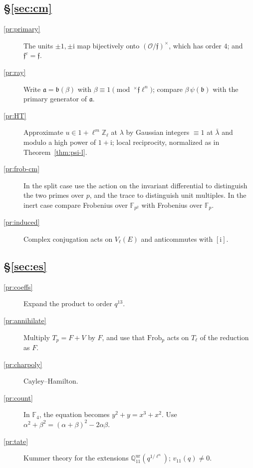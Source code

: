 \documentclass[reqno]{amsart}
\theoremstyle{definition}
\theoremstyle{plain}
\newcommand{\Z}{\mathbb{Z}}
\newcommand{\Q}{\mathbb{Q}}
\newcommand{\F}{\mathbb{F}}
\newcommand{\Oc}{\mathcal{O}}
\newcommand{\Frob}{\mathrm{Frob}}
\newcommand{\ii}{\mathrm{i}}
\begin{document}
\subsection*{\S\ref{sec:cm}}
\begin{description}
\item[\ref{pr:primary}] The units \(\pm 1, \pm\ii\) map bijectively onto \((\Oc/\mathfrak{f})^\times\), which has order \(4\); and \(\mathfrak{f}^c = \mathfrak{f}\).
\item[\ref{pr:ray}] Write \(\mathfrak{a} = \mathfrak{b}(\beta)\) with \(\beta \equiv 1 \pmod{^\times \mathfrak{f}\ell^n}\); compare \(\beta\,\psi(\mathfrak{b})\) with the primary generator of \(\mathfrak{a}\).
\item[\ref{pr:HT}] Approximate \(u \in 1 + \ell^m\Z_\ell\) at \(\lambda\) by Gaussian integers \(\equiv 1\) at \(\bar\lambda\) and modulo a high power of \(1 + \ii\); local reciprocity, normalized as in Theorem~\ref{thm:psi-l}.
\item[\ref{pr:frob-cm}] In the split case use the action on the invariant differential to distinguish the two primes over \(p\), and the trace to distinguish unit multiples.  In the inert case compare Frobenius over \(\F_{p^2}\) with Frobenius over \(\F_p\).
\item[\ref{pr:induced}] Complex conjugation acts on \(V_\ell(E)\) and anticommutes with \([\ii]\).
\end{description}

\subsection*{\S\ref{sec:es}}
\begin{description}
\item[\ref{pr:coeffs}] Expand the product to order \(q^{13}\).
\item[\ref{pr:annihilate}] Multiply \(T_p = F + V\) by \(F\), and use that \(\Frob_p\) acts on \(T_\ell\) of the reduction as \(F\).
\item[\ref{pr:charpoly}] Cayley--Hamilton.
\item[\ref{pr:count}] In \(\F_4\), the equation becomes \(y^2 + y = x^3 + x^2\).  Use \(\alpha^2 + \beta^2 = (\alpha+\beta)^2 - 2\alpha\beta\).
\item[\ref{pr:tate}] Kummer theory for the extensions \(\Q_{11}^{\mathrm{ur}}(q^{1/\ell^n})\); \(v_{11}(q) \ne 0\).
\end{description}
\end{document}
